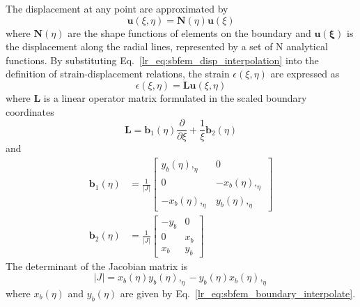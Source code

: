 The displacement at any point are approximated by
\begin{equation}
    \mathbf{u}(\xi,\eta) = \mathbf{N}(\eta) \mathbf{u}(\xi)
    \label{lr_eq:sbfem_disp_interpolation}
\end{equation}
%
where $\mathbf{N}(\eta)$ are the shape functions of elements on the boundary and $\mathbf{u(\xi)}$ is the displacement along the radial lines, represented by a set of N analytical functions.
By substituting Eq.~\ref{lr_eq:sbfem_disp_interpolation} into the definition of strain-displacement relations, the strain $\epsilon(\xi,\eta)$ are expressed as
\begin{equation}
    \epsilon(\xi,\eta) = \mathbf{Lu}(\xi,\eta)
    \label{lr_eq:sbfem_strain_disp_relation}
\end{equation}
%
where $\mathbf{L}$ is a linear operator matrix formulated in the scaled boundary coordinates
\begin{equation}
    \mathbf{L} =    \mathbf{b}_1(\eta) \frac{\partial}{\partial \xi} +
                    \frac{1}{\xi} \mathbf{b}_2(\eta)
    \label{lr_eq:sbfem_l_operator}
\end{equation}
%
and
\begin{equation}
    \begin{aligned}
    \mathbf{b}_1(\eta) & = \frac{1}{|J|}
            \begin{bmatrix}
                y_b(\eta),_{\eta}   &   0   \\
                0   &   -x_b(\eta),_{\eta}  \\
                -x_b(\eta),_{\eta} & y_b(\eta),_{\eta}
            \end{bmatrix} \\
    \mathbf{b}_2(\eta) & = \frac{1}{|J|}
            \begin{bmatrix}
                -y_b    &   0   \\
                0       &   x_b \\
                x_b     &   y_b
            \end{bmatrix}
    \end{aligned}
    \label{lr_eq:sbfem_little_b}
\end{equation}
%
The determinant of the Jacobian matrix is
\begin{equation}
    |J| = x_b(\eta)y_b(\eta),_{\eta}
        - y_b(\eta)x_b(\eta),_{\eta}
    \label{lr_eq:sbfem_Jdet}
\end{equation}
%
where $x_b(\eta)$ and $y_b(\eta)$ are given by Eq.~\ref{lr_eq:sbfem_boundary_interpolate}.
